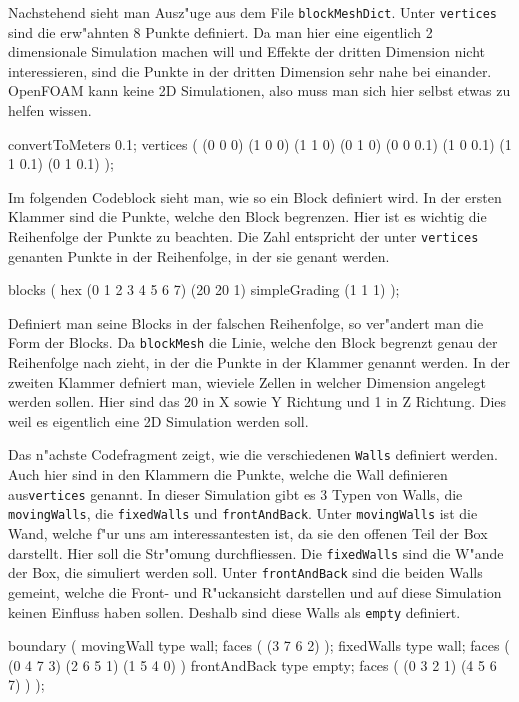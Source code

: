 \begin{refsection}
Nachstehend sieht man Ausz"uge aus dem File \texttt{blockMeshDict}. Unter
\texttt{vertices} sind die erw"ahnten 8 Punkte definiert.  Da man hier
eine eigentlich 2 dimensionale Simulation machen will und Effekte der
dritten Dimension nicht interessieren, sind die Punkte in der dritten
Dimension sehr nahe bei einander. OpenFOAM kann keine 2D Simulationen,
also muss man sich hier selbst etwas zu helfen wissen.
\begin{ofcode}
convertToMeters 0.1;
vertices
(
	(0 0 0)
	(1 0 0)
	(1 1 0)
	(0 1 0)
	(0 0 0.1)
	(1 0 0.1)
	(1 1 0.1)
	(0 1 0.1)
);
\end{ofcode}

Im folgenden Codeblock sieht man, wie so ein Block
definiert wird. In der ersten Klammer sind die Punkte, welche den Block
begrenzen. Hier ist es wichtig die Reihenfolge der Punkte zu beachten. Die
Zahl entspricht der unter \texttt{vertices} genanten Punkte in der
Reihenfolge, in der sie genant werden.
\begin{ofcode}
blocks
(
	hex (0 1 2 3 4 5 6 7) (20 20 1) simpleGrading (1 1 1)
);
\end{ofcode}

Definiert man seine Blocks in der falschen Reihenfolge, so ver"andert man
die Form der Blocks. Da \texttt{blockMesh} die Linie, welche den Block
begrenzt genau der Reihenfolge nach zieht, in der die Punkte in der
Klammer genannt werden. In der zweiten Klammer defniert man, wieviele
Zellen in welcher Dimension angelegt werden sollen.  Hier sind das 20
in X sowie Y Richtung und 1 in Z Richtung. Dies weil es eigentlich eine
2D Simulation werden soll.

Das n"achste Codefragment zeigt, wie die verschiedenen \texttt{Walls}
definiert werden. Auch hier sind in den Klammern die Punkte, welche die
Wall definieren aus\texttt{vertices} genannt. In dieser Simulation gibt
es 3 Typen von Walls, die \texttt{movingWalls}, die \texttt{fixedWalls}
und  \texttt{frontAndBack}. Unter \texttt{movingWalls} ist die
Wand, welche f"ur uns am interessantesten ist, da sie den offenen
Teil der Box darstellt. Hier soll die Str"omung durchfliessen. Die
\texttt{fixedWalls} sind die W"ande der Box, die simuliert werden
soll. Unter \texttt{frontAndBack} sind die beiden Walls gemeint, welche
die Front- und R"uckansicht darstellen und auf diese Simulation keinen
Einfluss haben sollen. Deshalb sind diese Walls als \texttt{empty}
definiert.
\begin{ofcode}
boundary
(
	movingWall
	{
		type wall;
		faces
		(
			(3 7 6 2)
		);
	}
	fixedWalls
	{
		type wall;
		faces
		(
			(0 4 7 3)
			(2 6 5 1)
			(1 5 4 0)
		)
	}
	frontAndBack
	{
		type empty;
		faces
		(
			(0 3 2 1)
			(4 5 6 7)
		)
	}
);
\end{ofcode}


\end{refsection}
